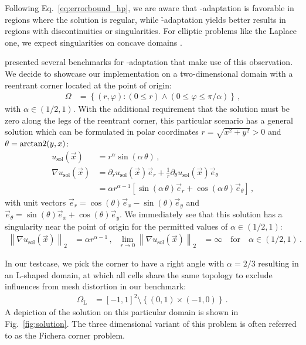 Following Eq.~\ref{eq:errorbound_hp}, we are aware that \p-adaptation is favorable in regions where the solution is regular, while \h-adaptation yields better results in regions with discontinuities or singularities. For elliptic problems like the Laplace one, we expect singularities on concave domains \parencite[Sec.~5.5]{brenner2008}.

\textcite{mitchell2014} presented several benchmarks for \hp-adaptation that make use of this observation. We decide to showcase our implementation on a two-dimensional domain with a reentrant corner located at the point of origin:
\begin{align}
\Omega &= \left\{ (r,\varphi) : (0 \leq r) \wedge( 0 \leq \varphi \leq \pi/\alpha) \right\} \,\text{,}
\end{align}
with $\alpha \in \left(1/2, 1\right)$. With the additional requirement that the solution must be zero along the legs of the reentrant corner, this particular scenario has a general solution which can be formulated in polar coordinates $r = \sqrt{x^2 + y^2} > 0$ and $\theta = \operatorname{arctan2}(y,x)$:
\begin{align}
u_\text{sol}(\vec{x}) &= r^\alpha \sin(\alpha \, \theta) \,\text{,} \\
\nonumber \nabla u_\text{sol}(\vec{x}) &= \partial_r u_\text{sol}(\vec{x}) \vec{e}_r + \frac{1}{r} \partial_\theta u_\text{sol}(\vec{x}) \vec{e}_\theta \\
&= \alpha r^{\alpha - 1} \left[ \sin(\alpha \, \theta) \vec{e}_r + \cos(\alpha \, \theta) \vec{e}_\theta \right] \,\text{,}
\end{align}
with unit vectors \(\vec{e}_r = \cos(\theta) \vec{e}_x - \sin(\theta) \vec{e}_y\) and \(\vec{e}_\theta = \sin(\theta) \vec{e}_x + \cos(\theta) \vec{e}_y\). We immediately see that this solution has a singularity near the point of origin for the permitted values of $\alpha \in \left(1/2, 1\right)$:
\begin{align}
\left\| \nabla u_\text{sol}(\vec{x}) \right\|_{2} &= \alpha r^{\alpha - 1} \,\text{,} & \lim\limits_{r \rightarrow 0} \left\| \nabla u_\text{sol}(\vec{x}) \right\|_{2} &= \infty \quad\text{for}\quad \alpha \in \left(1/2, 1\right) \,\text{.}
\end{align}

In our testcase, we pick the corner to have a right angle with $\alpha = 2/3$ resulting in an L-shaped domain, at which all cells share the same topology to exclude influences from mesh distortion in our benchmark:
\begin{align}
\Omega_\text{L} &= \left[-1,1\right]^2 \setminus \left\{ \left(0,1\right) \times \left(-1, 0\right) \right\} \,\text{.}
\end{align}
A depiction of the solution on this particular domain is shown in Fig.~\ref{fig:solution}. The three dimensional variant of this problem is often referred to as the Fichera corner problem.

